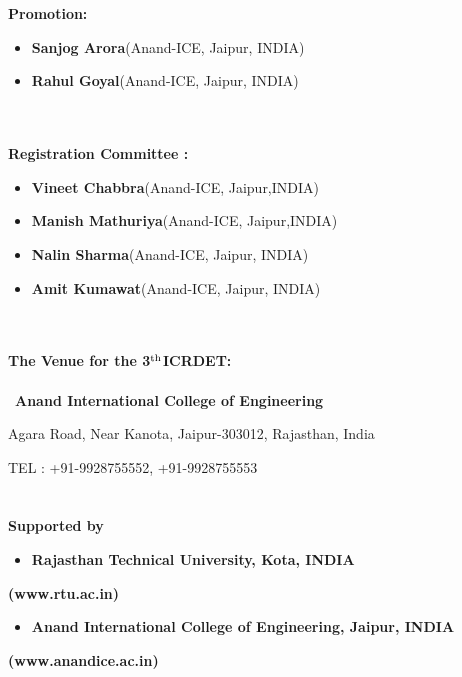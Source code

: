 \documentclass[twoside,11pt]{amsart}
\begin{document}
\noindent
\\
\\
{\Large \bf Promotion:}
\\
\begin{itemize}
\item \textbf{ Sanjog Arora}(Anand-ICE, Jaipur, INDIA)
\item\textbf{Rahul Goyal}(Anand-ICE, Jaipur, INDIA)
\end{itemize}
\noindent
\\
\\
{\Large \bf Registration Committee : }
\\
\begin{itemize}
\item \textbf{Vineet Chabbra}(Anand-ICE, Jaipur,INDIA)
\item\textbf{Manish Mathuriya}(Anand-ICE, Jaipur,INDIA)
\item \textbf{Nalin Sharma}(Anand-ICE, Jaipur, INDIA)
\item\textbf{Amit Kumawat}(Anand-ICE, Jaipur, INDIA)
\end{itemize}
\newpage
\vskip 5mm
\noindent
\\
\\
{\Large \bf
The Venue for the 3${}^{\rm th}$ICRDET: }
\\
\\
\noindent
\ {\Large \bf Anand International College of Engineering
}

	Agara Road, Near Kanota, Jaipur-303012, Rajasthan, India

\qquad TEL : +91-9928755552, +91-9928755553
\\
\\
\\
\noindent
{\Large \bf Supported by }
\\[7pt]
\noindent

\begin{itemize}
 \item  {\bf
Rajasthan Technical University, Kota, INDIA}
\end{itemize}
\hskip 15mm {\bf(www.rtu.ac.in)}
\begin{itemize}
\item  {\bf
Anand International College of Engineering, Jaipur, INDIA}
\end{itemize}
\hskip 15mm {\bf(www.anandice.ac.in)}


\end{document}
